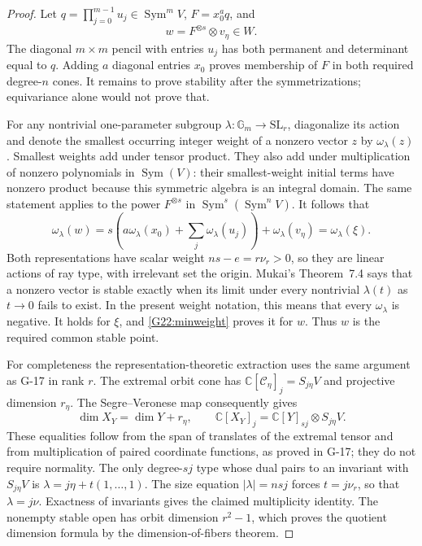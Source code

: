 \begin{proof}
Let $q=\prod_{j=0}^{m-1}u_j\in\operatorname{Sym}^mV$,
$F=x_0^a q$, and
\[
 w=F^{\otimes s}\otimes v_\eta\in W.
\]
The diagonal $m\times m$ pencil with entries $u_j$ has both
permanent and determinant equal to $q$. Adding $a$ diagonal
entries $x_0$ proves membership of $F$ in both required
degree-$n$ cones. It remains to prove stability after the
symmetrizations; equivariance alone would not prove that.

For any nontrivial one-parameter subgroup
$\lambda:\mathbb G_m\to\mathrm{SL}_r$, diagonalize its action
and denote the smallest occurring integer weight of a nonzero
vector $z$ by $\omega_\lambda(z)$. Smallest weights add under
tensor product. They also add under multiplication of nonzero
polynomials in $\operatorname{Sym}(V)$: their smallest-weight
initial terms have nonzero product because this symmetric
algebra is an integral domain. The same statement applies
to the power $F^{\otimes s}$ in
$\operatorname{Sym}^s(\operatorname{Sym}^nV)$.
It follows that
\begin{equation}\label{G22:minweight}
 \omega_\lambda(w)
 =s\left(a\omega_\lambda(x_0)+
             \sum_j\omega_\lambda(u_j)\right)
                +\omega_\lambda(v_\eta)
 =\omega_\lambda(\xi).
\end{equation}
Both representations have scalar weight
$ns-e=r\nu_r>0$, so they are linear actions of ray type,
with irrelevant set the origin. Mukai's Theorem~7.4 says
that a nonzero vector is stable exactly when its limit
under every nontrivial $\lambda(t)$ as $t\to0$ fails to
exist. In the present weight notation, this means that
every $\omega_\lambda$ is negative. It holds for $\xi$,
and \eqref{G22:minweight} proves it for $w$. Thus $w$ is
the required common stable point.

For completeness the representation-theoretic extraction
uses the same argument as G-17 in rank $r$. The extremal
orbit cone has
$\mathbb C[\mathcal C_\eta]_j=S_{j\eta}V$ and projective
dimension $r_\eta$. The Segre--Veronese map consequently gives
\[
 \dim X_Y=\dim Y+r_\eta,\qquad
 \mathbb C[X_Y]_j=\mathbb C[Y]_{sj}\otimes S_{j\eta}V.
\]
These equalities follow from the span of translates of the
extremal tensor and from multiplication of paired coordinate
functions, as proved in G-17; they do not require normality.
The only degree-$sj$ type whose dual pairs to an invariant
with $S_{j\eta}V$ is
$\lambda=j\eta+t(1,\ldots,1)$.
The size equation $|\lambda|=nsj$ forces $t=j\nu_r$,
so that $\lambda=j\nu$. Exactness of invariants gives the
claimed multiplicity identity. The nonempty stable open
has orbit dimension $r^2-1$, which proves the quotient
dimension formula by the dimension-of-fibers theorem.
\end{proof}

